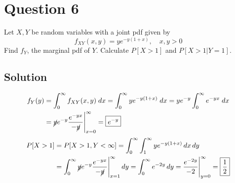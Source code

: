 \section*{Question 6}

Let \( X, Y \) be random variables with a joint pdf given by
\[
    f_{XY}(x,y)=ye^{-y(1+x)}, \quad x,y>0
\]
Find \(f_Y\), the marginal pdf of \(Y\).
Calculate \(P [X > 1]\) and \(P[X > 1|Y = 1]\).

\subsection*{Solution}

\begin{align*}
    f_Y(y)
     & =
    \int_{0}^{\infty} f_{XY}(x, y) \; dx
    =
    \int_{0}^{\infty} ye^{-y(1+x)} \; dx
    =
    y e^{-y} \int_{0}^{\infty} e^{-yx} \; dx
    \\ & =
    \cancel{y} e^{-y} \frac{e^{-yx}}{-\cancel{y}} \Bigg|_{x=0}^{\infty}
    =
    \boxed{
        e^{-y}
    }
\end{align*}
\begin{align*}
    P[X > 1]
     & =
    P[X > 1, Y < \infty]
    =
    \int_{0}^{\infty}
    \int_{1}^{\infty}
    ye^{-y(1+x)} \, dx \, dy
    \\ & =
    \int_{0}^{\infty}
    \cancel{y} e^{-y} \frac{e^{-yx}}{-\cancel{y}} \Bigg|_{x=1}^{\infty} \, dy
    =
    \int_{0}^{\infty}
    e^{-2y} \, dy
    =
    \frac{e^{-2y}}{-2} \Bigg|_{y=0}^{\infty}
    =
    \boxed{
        \frac{1}{2}
    }
\end{align*}
